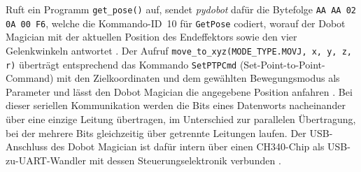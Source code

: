 Ruft ein Programm \texttt{get\_pose()} auf, sendet \emph{pydobot} dafür die Bytefolge \texttt{AA AA 02 0A 00 F6}, welche die Kommando-ID~10 für \texttt{GetPose} codiert, worauf der Dobot Magician mit der aktuellen Position des Endeffektors sowie den vier Gelenkwinkeln antwortet \cite{dobot_communication_protocol}.
Der Aufruf \texttt{move\_\allowbreak to\_\allowbreak xyz(MODE\_\allowbreak TYPE.MOVJ, x, y, z, r)} überträgt entsprechend das Kommando \texttt{SetPTPCmd} (Set-Point-to-Point-Command) mit den Zielkoordinaten und dem gewählten Bewegungsmodus als Parameter und lässt den Dobot Magician die angegebene Position anfahren \cite{pydobot_docs}.
Bei dieser seriellen Kommunikation werden die Bits eines Datenworts nacheinander über eine einzige Leitung übertragen, im Unterschied zur parallelen Übertragung, bei der mehrere Bits gleichzeitig über getrennte Leitungen laufen.
Der USB-Anschluss des Dobot Magician ist dafür intern über einen CH340-Chip als USB-zu-UART-Wandler mit dessen Steuerungselektronik verbunden \cite{dobot_magician}.
